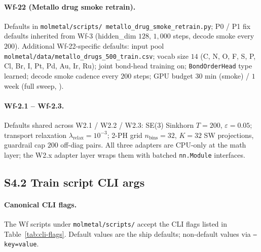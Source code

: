 \paragraph{Wf-22 (Metallo drug smoke retrain).}
Defaults in \texttt{molmetal/scripts/
metallo\_drug\_smoke\_retrain.py}; P0 / P1 fix defaults inherited
from Wf-3 (hidden\_dim $128$, $1{,}000$ steps, decode smoke
every $200$).  Additional Wf-22-specific defaults: input pool
\texttt{molmetal/data/metallo\_drugs\_500\_train.csv}; vocab size
$14$ (C, N, O, F, S, P, Cl, Br, I, Pt, Pd, Au, Ir, Ru); joint
bond-head training on; \texttt{BondOrderHead} type learned;
decode smoke cadence every $200$ steps; GPU budget $30$ min
(smoke) / $1$ week (full sweep, \PROJECTED{}).

\paragraph{Wf-2.1 -- Wf-2.3.}
Defaults shared across W2.1 / W2.2 / W2.3: SE(3) Sinkhorn
$T = 200$, $\varepsilon = 0.05$; transport relaxation
$\lambda_{\mathrm{relax}} = 10^{-3}$; 2-PH grid $n_{\mathrm{bins}} =
32$, $K = 32$ SW projections, guardrail cap $200$ off-diag pairs.
All three adapters are CPU-only at the math layer; the W2.x
adapter layer wraps them with batched \texttt{nn.Module}
interfaces.

\subsection*{S4.2 Train script CLI args}
\label{supp:s4-train-scripts}

\paragraph{Canonical CLI flags.}
The Wf scripts under \texttt{molmetal/scripts/} accept the CLI
flags listed in Table~\ref{tab:cli-flags}.  Default values are
the ship defaults; non-default values via \texttt{--key=value}.

